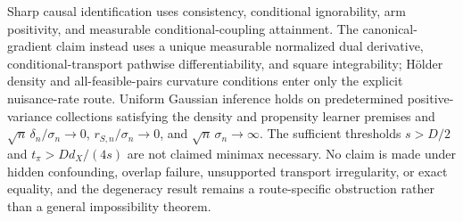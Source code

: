 \documentclass{article}
\begin{document}
Sharp causal identification uses consistency, conditional ignorability, arm positivity, and measurable conditional-coupling attainment. The canonical-gradient claim instead uses a unique measurable normalized dual derivative, conditional-transport pathwise differentiability, and square integrability; H\"older density and all-feasible-pairs curvature conditions enter only the explicit nuisance-rate route. Uniform Gaussian inference holds on predetermined positive-variance collections satisfying the density and propensity learner premises and \(\sqrt n\,\delta_n/\sigma_n\to0\), \(r_{S,n}/\sigma_n\to0\), and \(\sqrt n\,\sigma_n\to\infty\). The sufficient thresholds \(s>D/2\) and \(t_\pi>Dd_X/(4s)\) are not claimed minimax necessary. No claim is made under hidden confounding, overlap failure, unsupported transport irregularity, or exact equality, and the degeneracy result remains a route-specific obstruction rather than a general impossibility theorem.
\end{document}
